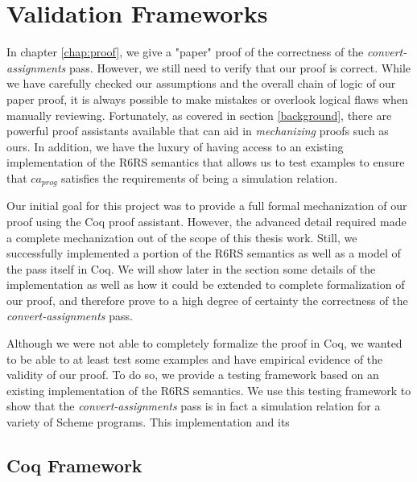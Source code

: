 \chapter{Validation Frameworks\label{chap:valid}}
In chapter \ref{chap:proof}, we give a "paper" proof of the correctness of the \textit{convert-assignments} pass. However, we still need to verify that our proof is correct. While we have carefully checked our assumptions and the overall chain of logic of our paper proof, it is always possible to make mistakes or overlook logical flaws when manually reviewing. Fortunately, as covered in section \ref{background}, there are powerful proof assistants available that can aid in \textit{mechanizing} proofs such as ours. In addition, we have the luxury of having access to an existing implementation of the R6RS semantics that allows us to test examples to ensure that $ca_{prog}$ satisfies the requirements of being a simulation relation.

Our initial goal for this project was to provide a full formal mechanization of our proof using the Coq proof assistant. However, the advanced detail required made a complete mechanization out of the scope of this thesis work. Still, we successfully implemented a portion of the R6RS semantics as well as a model of the pass itself in Coq. We will show later in the section some details of the implementation as well as how it could be extended to complete formalization of our proof, and therefore prove to a high degree of certainty the correctness of the \textit{convert-assignments} pass.

Although we were not able to completely formalize the proof in Coq, we wanted to be able to at least test some examples and have empirical evidence of the validity of our proof. To do so, we provide a testing framework based on an existing implementation of the R6RS semantics. We use this testing framework to show that the \textit{convert-assignments} pass is in fact a simulation relation for a variety of Scheme programs. This implementation and its 

\section{Coq Framework}

